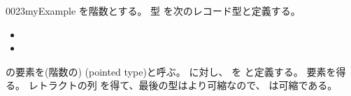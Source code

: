\documentclass[index]{subfiles}
\begin{document}
\StartDefiningTabulars
\begin{myBlock}{0023}{myExample}
  を階数とする。
  型
  を次のレコード型と定義する。
  \begin{itemize}
    \item {}
    \item \myInlineMath{\myPointedTypePoint \myElemOf \myPointedTypeCarrier}
  \end{itemize}
  の要素を(階数の)
  (pointed type)と呼ぶ。
  に対し、
  を
  と定義する。
  要素を得る。
  レトラクトの列
  を得て、最後の型はより可縮なので、
  は可縮である。
\end{myBlock}
\StopDefiningTabulars
\end{document}
